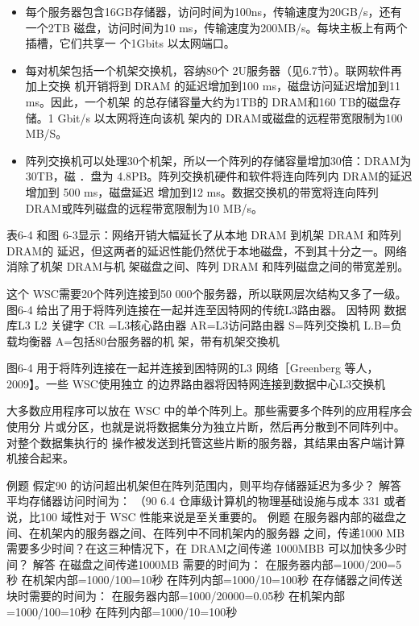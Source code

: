 \begin{itemize}
    \item 每个服务器包含16GB存储器，访问时间为100ns，传输速度为20GB/s，还有一个2TB
    磁盘，访问时间为10 ms，传输速度为200MB/s。每块主板上有两个插槽，它们共享一
    个1Gbits 以太网端口。
    \item 每对机架包括一个机架交换机，容纳80个 2U服务器（见6.7节）。联网软件再加上交换
    机开销将到 DRAM 的延迟增加到100 ms，磁盘访问延迟增加到11 ms。因此，一个机架
    的总存储容量大约为1TB的 DRAM和160 TB的磁盘存储。1 Gbit/s 以太网将连向该机
    架内的 DRAM或磁盘的远程带宽限制为100 MB/S。
    \item 阵列交换机可以处理30个机架，所以一个阵列的存储容量增加30倍：DRAM为30TB，磁
    ．盘为 4.8PB。阵列交换机硬件和软件将连向阵列内 DRAM的延迟增加到 500 ms，磁盘延迟
    增加到12 ms。数据交换机的带宽将连向阵列DRAM或阵列磁盘的远程带宽限制为10 MB/s。
\end{itemize}

表6-4 和图 6-3显示：网络开销大幅延长了从本地 DRAM 到机架 DRAM 和阵列 DRAM的
延迟，但这两者的延迟性能仍然优于本地磁盘，不到其十分之一。网络消除了机架 DRAM与机
架磁盘之间、阵列 DRAM 和阵列磁盘之间的带宽差别。

这个 WSC需要20个阵列连接到50 000个服务器，所以联网层次结构又多了一级。图6-4
给出了用于将阵列连接在一起并连至因特网的传统L3路由器。
因特网
数据库L3
L2
关键字
CR =L3核心路由器
AR=L3访问路由器
S=阵列交換机
L.B=负载均衡器
A=包括80台服务器的机
架，带有机架交換机

图6-4 用于将阵列连接在一起并连接到困特网的L3 网络［Greenberg 等人，2009】。一些 WSC使用独立
的边界路由器将因特网连接到数据中心L3交换机

大多数应用程序可以放在 WSC 中的单个阵列上。那些需要多个阵列的应用程序会使用分
片或分区，也就是说将数据集分为独立片断，然后再分散到不同阵列中。对整个数据集执行的
操作被发送到托管这些片断的服务器，其结果由客户端计算机接合起来。

例题
假定90%
的访问超出机架但在阵列范围内，则平均存储器延迟为多少？
解答
平均存储器访问时间为：
（90%
6.4 仓庫级计算机的物理基础设施与成本
331
或者说，比100%
域性对于 WSC 性能来说是至关重要的。
例题
在服务器内部的磁盘之间、在机架内的服务器之间、在阵列中不同机架内的服务器
之间，传递1000 MB 需要多少时间？在这三种情况下，在 DRAM之间传递 1000MBB
可以加快多少时间？
解答
在磁盘之间传递1000MB 需要的时间为：
在服务器内部=1000/200=5秒
在机架内部=1000/100=10秒
在阵列内部=1000/10=100秒
在存储器之间传送块时需要的时间为：
在服务器内部=1000/20000=0.05秒
在机架内部=1000/100=10秒
在阵列内部=1000/10=100秒

